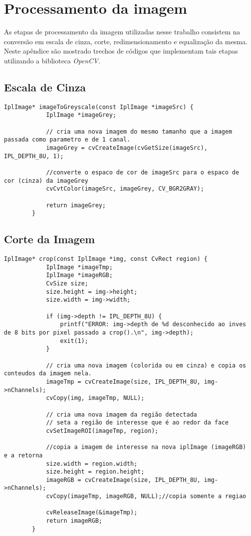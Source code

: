 \chapter{Processamento da imagem}
\label{apend:processamento}

As etapas de processamento da imagem utilizadas nesse trabalho consistem na conversão em escala de cinza, corte, redimensionamento e equalização da mesma. Neste apêndice são mostrado trechos de códigos que implementam tais etapas utilizando a biblioteca \textit{OpenCV}.

\section{Escala de Cinza}

		\begin{lstlisting}[caption=Conversão de uma imagem para escala de cinza., label=list:grey-scale]
		IplImage* imageToGreyscale(const IplImage *imageSrc) {
			IplImage *imageGrey;

			// cria uma nova imagem do mesmo tamanho que a imagem passada como parametro e de 1 canal.
			imageGrey = cvCreateImage(cvGetSize(imageSrc), IPL_DEPTH_8U, 1);

			//converte o espaco de cor de imageSrc para o espaco de cor (cinza) da imageGrey
			cvCvtColor(imageSrc, imageGrey, CV_BGR2GRAY);

			return imageGrey;
		}
		\end{lstlisting}

\section{Corte da Imagem}

	\begin{lstlisting}[caption=Corte de uma imagem., label=list:crop]
		IplImage* crop(const IplImage *img, const CvRect region) {
			IplImage *imageTmp;
			IplImage *imageRGB;
			CvSize size;
			size.height = img->height;
			size.width = img->width;

			if (img->depth != IPL_DEPTH_8U) {
				printf("ERROR: img->depth de %d desconhecido ao inves de 8 bits por pixel passado a crop().\n", img->depth);
				exit(1);
			}

			// cria uma nova imagem (colorida ou em cinza) e copia os conteudos da imagem nela.
			imageTmp = cvCreateImage(size, IPL_DEPTH_8U, img->nChannels);
			cvCopy(img, imageTmp, NULL);

			// cria uma nova imagem da região detectada
			// seta a região de interesse que é ao redor da face
			cvSetImageROI(imageTmp, region);

			//copia a imagem de interesse na nova iplImage (imageRGB) e a retorna
			size.width = region.width;
			size.height = region.height;
			imageRGB = cvCreateImage(size, IPL_DEPTH_8U, img->nChannels);
			cvCopy(imageTmp, imageRGB, NULL);//copia somente a regiao

			cvReleaseImage(&imageTmp);
			return imageRGB;
		}
	\end{lstlisting}

